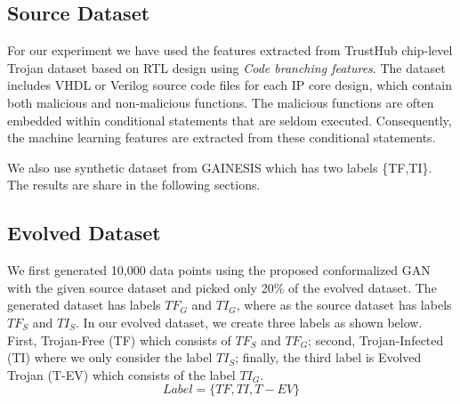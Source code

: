 
\subsection*{Source Dataset}
\label{Sec:Dataset}
For our experiment we have used the features extracted from TrustHub chip-level Trojan dataset based \cite{px6s-sm21-22} on RTL design using \textit{Code branching features}. The dataset includes VHDL or Verilog source code files for each IP core design, which contain both malicious and non-malicious functions. The malicious functions are often embedded within conditional statements that are seldom executed. Consequently, the machine learning features are extracted from these conditional statements. %

We also use synthetic dataset from GAINESIS which has two labels \{TF,TI\}. The results are share in the following sections.  

\subsection*{Evolved Dataset}
\label{Sec:EvolvedDataset}
We first generated 10,000 data points using the proposed conformalized GAN  with the given source dataset and picked only 20\% of the evolved dataset. The generated dataset has labels $TF_{G}$ and $TI_{G}$, where as the source dataset has labels $TF_{S}$ and $TI_{S}$. In our evolved dataset, we create three labels as shown below. First, Trojan-Free (TF) which consists of $TF_{S}$ and $TF_{G}$; second, Trojan-Infected (TI) where we only consider the label $TI_{S}$; finally, the third label is Evolved Trojan (T-EV) which consists of the label $TI_{G}$. 
$$Label = \{TF, TI, T-EV \}$$

